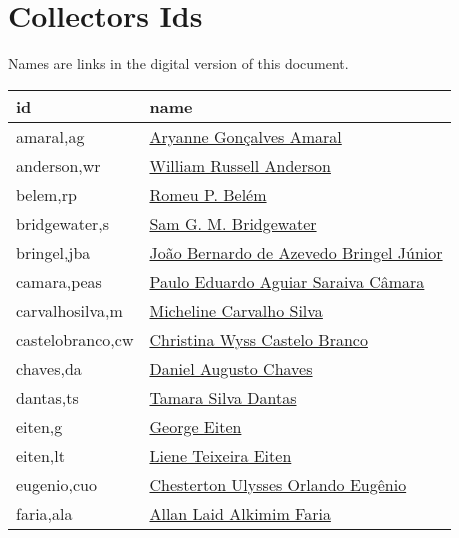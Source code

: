 \chapter{Collectors Ids}\label{appendix:collectors_ids}

\lipsum[50]

Names are links in the digital version of this document.
\begin{longtable}{l l}
	  id & name \\
      \hline
      amaral,ag           & \href{http://lattes.cnpq.br/0553088328180564}{Aryanne Gonçalves Amaral} \\
anderson,wr         & \hyperlink{https://plants.jstor.org/stable/10.5555/al.ap.person.bm000000177}{William Russell Anderson} \\
belem,rp            & \hyperlink{https://plants.jstor.org/stable/10.5555/al.ap.person.bm000026951}{Romeu P. Belém} \\
bridgewater,s       & \hyperlink{https://plants.jstor.org/stable/10.5555/al.ap.person.bm000120171}{Sam G. M. Bridgewater} \\
bringel,jba         & \hyperlink{http://lattes.cnpq.br/9359704960057451}{João Bernardo de Azevedo Bringel Júnior} \\
camara,peas         & \hyperlink{http://lattes.cnpq.br/2742831544064073}{Paulo Eduardo Aguiar Saraiva Câmara} \\
carvalhosilva,m     & \hyperlink{http://lattes.cnpq.br/1015868478480965}{Micheline Carvalho Silva} \\
castelobranco,cw    & \hyperlink{http://lattes.cnpq.br/6129052109183586}{Christina Wyss Castelo Branco} \\
chaves,da           & \hyperlink{http://lattes.cnpq.br/6993370381419092}{Daniel Augusto Chaves} \\
dantas,ts           & \hyperlink{http://lattes.cnpq.br/6233687711682398}{Tamara Silva Dantas} \\
eiten,g             & \hyperlink{https://plants.jstor.org/stable/10.5555/al.ap.person.bm000002352}{George Eiten} \\
eiten,lt            & \hyperlink{https://plants.jstor.org/stable/10.5555/al.ap.person.bm000002353}{Liene Teixeira Eiten} \\
eugenio,cuo         & \hyperlink{http://lattes.cnpq.br/3694741825113110}{Chesterton Ulysses Orlando Eugênio} \\
faria,ala           & \hyperlink{http://lattes.cnpq.br/3988533384771339}{Allan Laid Alkimim Faria} \\

\end{longtable}
